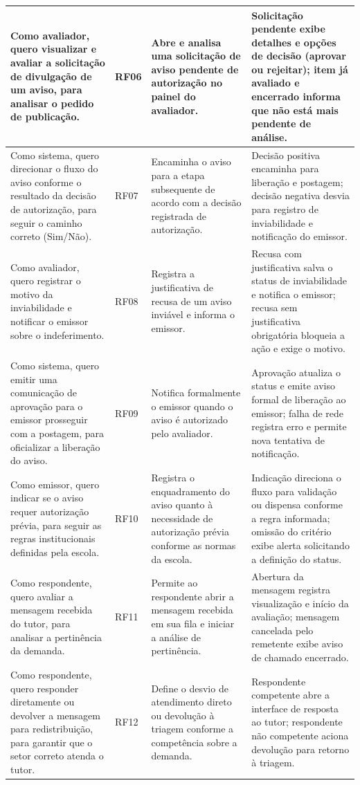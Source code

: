 \documentclass[a4paper,12pt]{report}
\begin{document}
\begin{longtable}{|p{3.8cm}|p{1.8cm}|p{4.2cm}|p{4.8cm}|}
\hline
Como avaliador, quero visualizar e avaliar a solicitação de divulgação de um aviso, para analisar o pedido de publicação. & RF06 & Abre e analisa uma solicitação de aviso pendente de autorização no painel do avaliador. & Solicitação pendente exibe detalhes e opções de decisão (aprovar ou rejeitar); item já avaliado e encerrado informa que não está mais pendente de análise. \\
\hline
Como sistema, quero direcionar o fluxo do aviso conforme o resultado da decisão de autorização, para seguir o caminho correto (Sim/Não). & RF07 & Encaminha o aviso para a etapa subsequente de acordo com a decisão registrada de autorização. & Decisão positiva encaminha para liberação e postagem; decisão negativa desvia para registro de inviabilidade e notificação do emissor. \\
\hline
Como avaliador, quero registrar o motivo da inviabilidade e notificar o emissor sobre o indeferimento. & RF08 & Registra a justificativa de recusa de um aviso inviável e informa o emissor. & Recusa com justificativa salva o status de inviabilidade e notifica o emissor; recusa sem justificativa obrigatória bloqueia a ação e exige o motivo. \\
\hline
Como sistema, quero emitir uma comunicação de aprovação para o emissor prosseguir com a postagem, para oficializar a liberação do aviso. & RF09 & Notifica formalmente o emissor quando o aviso é autorizado pelo avaliador. & Aprovação atualiza o status e emite aviso formal de liberação ao emissor; falha de rede registra erro e permite nova tentativa de notificação. \\
\hline
Como emissor, quero indicar se o aviso requer autorização prévia, para seguir as regras institucionais definidas pela escola. & RF10 & Registra o enquadramento do aviso quanto à necessidade de autorização prévia conforme as normas da escola. & Indicação direciona o fluxo para validação ou dispensa conforme a regra informada; omissão do critério exibe alerta solicitando a definição do status. \\
\hline
Como respondente, quero avaliar a mensagem recebida do tutor, para analisar a pertinência da demanda. & RF11 & Permite ao respondente abrir a mensagem recebida em sua fila e iniciar a análise de pertinência. & Abertura da mensagem registra visualização e início da avaliação; mensagem cancelada pelo remetente exibe aviso de chamado encerrado. \\
\hline
Como respondente, quero responder diretamente ou devolver a mensagem para redistribuição, para garantir que o setor correto atenda o tutor. & RF12 & Define o desvio de atendimento direto ou devolução à triagem conforme a competência sobre a demanda. & Respondente competente abre a interface de resposta ao tutor; respondente não competente aciona devolução para retorno à triagem. \\

\end{longtable}
\end{document}
